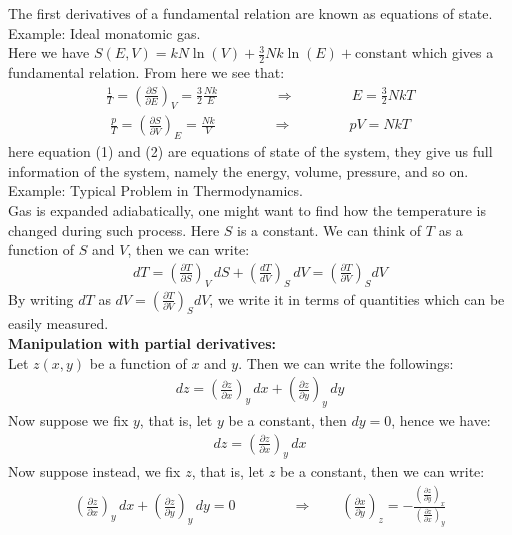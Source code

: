 \documentclass[11pt]{article}
\theoremstyle{break}
\theoremstyle{break}
\newcommand{\example}{\color{green}Example: \color{black}}
\begin{document}
The first derivatives of a fundamental relation are known as equations of state.\\

\example Ideal monatomic gas.\\
Here we have $S(E,V) = kN\ln(V) +\frac{3}{2}Nk \ln(E)+ \text{constant}$ which gives a fundamental relation. From here we see that:
\begin{align*}
\frac{1}{T} =  \left( \frac{\partial S}{\partial E}\right)_V = \frac{3}{2}\frac{Nk}{E} \qquad\qquad \Rightarrow\qquad\qquad E = \frac{3}{2}NkT \tag{1}
\end{align*}
\begin{align*}
\frac{p}{T} = \left( \frac{\partial S}{\partial V}\right)_E = \frac{Nk}{V} \qquad\qquad \Rightarrow\qquad\qquad pV = NkT \tag{2}
\end{align*}
here equation (1) and (2) are equations of state of the system, they give us full information of the system, namely the energy, volume, pressure, and so on. \\


\example Typical Problem in Thermodynamics.\\
Gas is expanded adiabatically, one might want to find how the temperature is changed during such process. Here $S$ is a constant. We can think of $T$ as a function of $S$ and $V$, then we can write:
\begin{align*}
dT = \left( \frac{\partial T}{\partial S} \right)_V \, dS + \left( \frac{dT}{dV}\right)_S \, dV = \left( \frac{\partial T}{\partial V}\right)_S dV
\end{align*}
By writing $dT$ as $dV = \left( \frac{\partial T}{\partial V}\right)_S dV$, we write it in terms of quantities which can be easily measured. \\

\newpage
\textbf{Manipulation with partial derivatives:}\\
Let $z(x,y)$ be a function of $x$ and $y$. Then we can write the followings:
\begin{align*}
dz = \left( \frac{\partial z}{\partial x}\right)_y \, dx + \left( \frac{\partial z}{\partial y}\right)_y \, dy
\end{align*}
Now suppose we fix $y$, that is, let $y$ be a constant, then $dy = 0$, hence we have:
\begin{align*}
dz = \left( \frac{\partial z}{\partial x}\right)_y \, dx 
\end{align*}
Now suppose instead, we fix $z$, that is, let $z$ be a constant, then we can write:
\begin{align*}
 \left( \frac{\partial z}{\partial x}\right)_y \, dx + \left( \frac{\partial z}{\partial y}\right)_y \, dy = 0 \qquad \qquad \Rightarrow \qquad \left( \frac{\partial x}{\partial y}\right)_z = - \frac{\left(\frac{\partial z}{\partial y} \right)_x}{\left(\frac{\partial z}{\partial x}\right)_y}
\end{align*}
\end{document}
